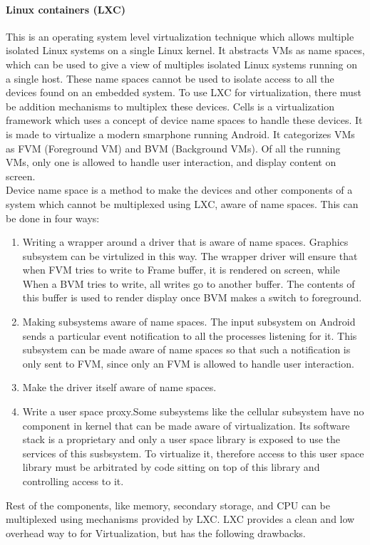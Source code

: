 \documentclass[seminar,twoside]{iitbreport}
\begin{document}
  \paragraph{Linux containers (LXC)}
  This is an operating system level virtualization technique which allows multiple isolated Linux systems on a single Linux kernel. It abstracts VMs as name spaces, which
  can be used to give a view of multiples isolated Linux systems running on a single host. These name spaces cannot be used to isolate access to all the devices found on an embedded system. To
  use LXC for virtualization, there must be addition mechanisms to multiplex these devices. Cells\cite{Andrus:2011:CVM:2043556.2043574} is a virtualization framework
  which uses a concept of device name spaces to handle these devices. It is made to virtualize a modern smarphone running Android. It categorizes VMs as FVM (Foreground VM) and BVM (Background VMs).
  Of all the running VMs, only one is allowed to handle user interaction, and display content on screen.
  \\Device name space is a method to make the devices and other components of a system which cannot be multiplexed using LXC, aware of name spaces. This can be done in four ways:
  \begin{enumerate}
   \item Writing a wrapper around a driver that is aware of name spaces. Graphics subsystem can be virtulized in this way. The wrapper driver will ensure
   that when FVM tries to write to Frame buffer, it is rendered on screen, while When a BVM  tries to write, all writes go to another buffer. The contents of this buffer
   is used to render display once BVM makes a switch to foreground.
   \item Making subsystems aware of name spaces. The input subsystem on Android sends a particular event notification to all the processes listening for it. This subsystem
   can be made aware of name spaces so that such a notification is only sent to FVM, since only an FVM is allowed to handle user interaction.
   \item Make the driver itself aware of name spaces.
   \item Write a user space proxy.Some subsystems like the cellular subsystem have no component in kernel that can be made aware of virtualization. Its software stack is
   a proprietary and only a user space library is exposed to use the services of this susbsystem. To virtualize it, therefore access to this user space library must be
   arbitrated by code sitting on top of this library and controlling access to it.
  \end{enumerate}
Rest of the components, like memory, secondary storage, and CPU can be multiplexed using mechanisms provided by LXC.
LXC provides a clean and low overhead way to for Virtualization, but has the following drawbacks.
  
\end{document}
